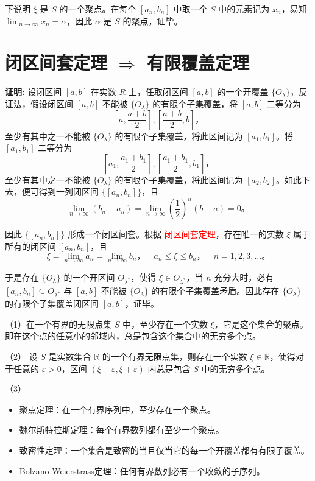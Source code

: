 \documentclass[lang=cn,newtx,10pt,scheme=chinese]{elegantbook}
\begin{document}
下说明 $\xi$ 是 $S$ 的一个聚点。在每个 $[a_n, b_n]$ 中取一个 $S$ 中的元素记为 $x_n$，易知 $\lim_{n \to \infty} x_n = \alpha$，因此 $\alpha$ 是 $S$ 的聚点，证毕。


\section*{闭区间套定理 $\Rightarrow$ 有限覆盖定理}

\textbf{证明:} 设闭区间 $[a, b]$ 在实数 $R$ 上，任取闭区间 $[a, b]$ 的一个开覆盖 $\{O_{\lambda}\}$，反证法，假设闭区间 $[a, b]$ 不能被 $\{O_{\lambda}\}$ 的有限个子集覆盖，将 $[a, b]$ 二等分为
\[
\left[ a, \frac{a + b}{2} \right], \left[ \frac{a + b}{2}, b \right]，
\]
至少有其中之一不能被 $\{O_{\lambda}\}$ 的有限个子集覆盖，将此区间记为 $[a_1, b_1]$。将 $[a_1, b_1]$ 二等分为
\[
\left[ a_1, \frac{a_1 + b_1}{2} \right], \left[ \frac{a_1 + b_1}{2}, b_1 \right]，
\]
至少有其中之一不能被 $\{O_{\lambda}\}$ 的有限个子集覆盖，将此区间记为 $[a_2, b_2]$。如此下去，便可得到一列闭区间 $\{[a_n, b_n]\}$，且
\[
\lim_{n \to \infty} (b_n - a_n) = \lim_{n \to \infty} \left(\frac{1}{2}\right)^n (b - a) = 0。
\]

因此 $\{[a_n, b_n]\}$ 形成一个闭区间套。根据 \textcolor{red}{闭区间套定理}，存在唯一的实数 $\xi$ 属于所有的闭区间 $[a_n, b_n]$，且
\[
\xi = \lim_{n \to \infty} a_n = \lim_{n \to \infty} b_n， \quad a_n \leq \xi \leq b_n，\quad n = 1, 2, 3, \ldots。
\]

于是存在 $\{O_{\lambda}\}$ 的一个开区间 $O_{\lambda^*}$，使得 $\xi \in O_{\lambda^*}$，当 $n$ 充分大时，必有 $[a_n, b_n] \subseteq O_{\lambda^*}$ 与 $[a, b]$ 不能被 $\{O_{\lambda}\}$ 的有限个子集覆盖矛盾。因此存在 $\{O_{\lambda}\}$ 的有限个子集覆盖闭区间 $[a, b]$，证毕。


\begin{theorem}[ 聚点定理] \label{tabe222}
（1）在一个有界的无限点集 $S$ 中，至少存在一个实数 $\xi$，它是这个集合的聚点。即在这个点的任意小的邻域内，总是包含这个集合中的无穷多个点。

   （2） 设 $S$ 是实数集合 $\mathbb{R}$ 的一个有界无限点集，则存在一个实数 $\xi \in \mathbb{R}$，使得对于任意的 $\varepsilon > 0$，区间 $(\xi - \varepsilon, \xi + \varepsilon)$ 内总是包含 $S$ 中的无穷多个点。

（3）\  \begin{itemize}
      \item 聚点定理：在一个有界序列中，至少存在一个聚点。
      \item 魏尔斯特拉斯定理：每个有界数列都有至少一个聚点。
      \item 致密性定理：一个集合是致密的当且仅当它的每一个开覆盖都有有限子覆盖。
      \item Bolzano-Weierstrass定理：任何有界数列必有一个收敛的子序列。
    \end{itemize}

\end{theorem}
\end{document}
